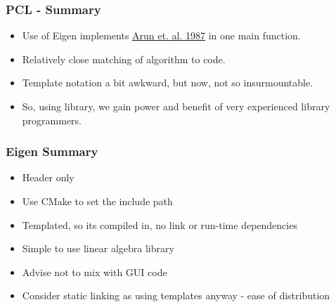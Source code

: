 \begin{Shaded}
\begin{Highlighting}[]
  \NormalTok{, }

  \NormalTok{, }
   \NormalTok{, }\NormalTok{));}
  \NormalTok{, }\NormalTok{, }\NormalTok{, }
\NormalTok{\}}
\end{Highlighting}
\end{Shaded}

\subsubsection{PCL - Summary}\label{pcl---summary}

\begin{itemize}
\itemsep1pt\parskip0pt
\item
  Use of Eigen implements
  \href{http://dl.acm.org/citation.cfm?id=28821}{Arun et. al. 1987} in
  one main function.
\item
  Relatively close matching of algorithm to code.
\item
  Template notation a bit awkward, but now, not so insurmountable.
\item
  So, using library, we gain power and benefit of very experienced
  library programmers.
\end{itemize}

\subsubsection{Eigen Summary}\label{eigen-summary}

\begin{itemize}
\itemsep1pt\parskip0pt
\item
  Header only
\item
  Use CMake to set the include path
\item
  Templated, so its compiled in, no link or run-time dependencies
\item
  Simple to use linear algebra library
\item
  Advise not to mix with GUI code
\item
  Consider static linking as using templates anyway - ease of
  distribution
\end{itemize}

